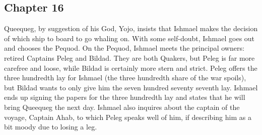 \subsection{Chapter 16}

Queequeg, by suggestion of his God, Yojo, insists that Ishmael makes the
decision of which ship to board to go whaling on. With some self-doubt, Ishmael
goes out and chooses the Pequod. On the Pequod, Ishmael meets the principal
owners: retired Captains Peleg and Bildad. They are both Quakers, but Peleg is
far more carefree and loose, while Bildad is certainly more stern and strict.
Peleg offers the three hundredth lay for Ishmael (the three hundredth share of
the war spoils), but Bildad wants to only give him the seven hundred seventy
seventh lay. Ishmael ends up signing the papers for the three hundredth lay and
states that he will bring Queequeg the next day. Ishmael also inquires about
the captain of the voyage, Captain Ahab, to which Peleg speaks well of him, if
describing him as a bit moody due to losing a leg.
